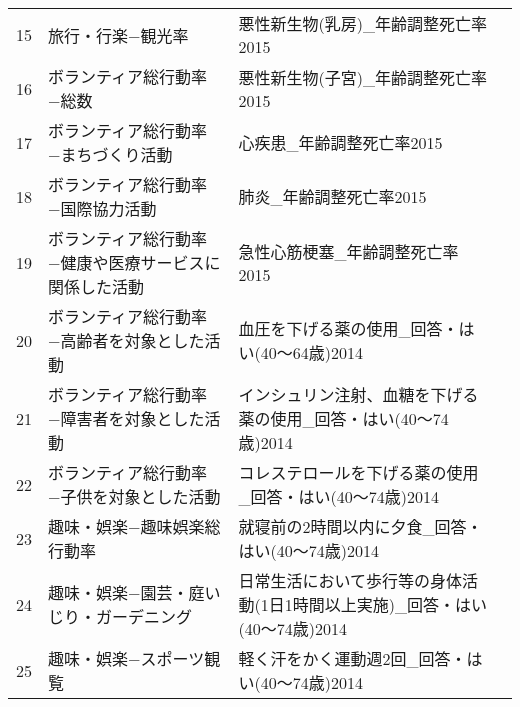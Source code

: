 \begin{table}[ht]
\begin{adjustbox}{width=.5\textwidth}
\begin{tabular}{rlll}
  15 & 旅行・行楽−観光率 & 悪性新生物(乳房)\_年齢調整死亡率2015 &  \\
  16 & ボランティア総行動率−総数 & 悪性新生物(子宮)\_年齢調整死亡率2015 &  \\
  17 & ボランティア総行動率−まちづくり活動 & 心疾患\_年齢調整死亡率2015 &  \\
  18 & ボランティア総行動率−国際協力活動 & 肺炎\_年齢調整死亡率2015 &  \\
  19 & ボランティア総行動率−健康や医療サービスに関係した活動 & 急性心筋梗塞\_年齢調整死亡率2015 &  \\
  20 & ボランティア総行動率−高齢者を対象とした活動 & 血圧を下げる薬の使用\_回答・はい(40〜64歳)2014 &  \\
  21 & ボランティア総行動率−障害者を対象とした活動 & インシュリン注射、血糖を下げる薬の使用\_回答・はい(40〜74歳)2014 &  \\
  22 & ボランティア総行動率−子供を対象とした活動 & コレステロールを下げる薬の使用\_回答・はい(40〜74歳)2014 &  \\
  23 & 趣味・娯楽−趣味娯楽総行動率 & 就寝前の2時間以内に夕食\_回答・はい(40〜74歳)2014 &  \\
  24 & 趣味・娯楽−園芸・庭いじり・ガーデニング & 日常生活において歩行等の身体活動(1日1時間以上実施)\_回答・はい(40〜74歳)2014 &  \\
  25 & 趣味・娯楽−スポーツ観覧 & 軽く汗をかく運動週2回\_回答・はい(40〜74歳)2014 &  \\
   \hline
\end{tabular}
\end{adjustbox}

\endgroup
\end{table}
